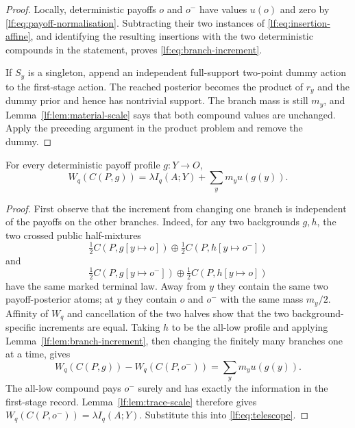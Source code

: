 \begin{proof}
Locally, deterministic payoffs $o$ and $o^-$ have values $u(o)$ and zero by
\eqref{lf:eq:payoff-normalisation}.  Subtracting their two instances of
\eqref{lf:eq:insertion-affine}, and identifying the resulting insertions with
the two deterministic compounds in the statement, proves
\eqref{lf:eq:branch-increment}.

If $S_y$ is a singleton, append an independent full-support two-point dummy
action to the first-stage action.  The reached posterior becomes the product of
$r_y$ and the dummy prior and hence has nontrivial support.  The branch mass is
still $m_y$, and Lemma~\ref{lf:lem:material-scale} says that both compound
values are unchanged.  Apply the preceding argument in the product problem and
remove the dummy.
\end{proof}

\begin{lemma}\label{lf:lem:deterministic-assembly}
For every deterministic payoff profile $g:Y\to O$,
\begin{equation}
W_q(C(P,g))
=\lambda I_q(A;Y)+\sum_y m_y u(g(y)).
\label{lf:eq:deterministic-assembly}
\end{equation}
\end{lemma}

\begin{proof}
First observe that the increment from changing one branch is independent of
the payoffs on the other branches.  Indeed, for any two backgrounds $g,h$, the
two crossed public half-mixtures
\[
\tfrac12 C(P,g[y\mapsto o])
\oplus\tfrac12 C(P,h[y\mapsto o^-])
\]
and
\[
\tfrac12 C(P,g[y\mapsto o^-])
\oplus\tfrac12 C(P,h[y\mapsto o])
\]
have the same marked terminal law.  Away from $y$ they contain the same two
payoff-posterior atoms; at $y$ they contain $o$ and $o^-$ with the same mass
$m_y/2$.  Affinity of $W_q$ and cancellation of the two halves show that the
two background-specific increments are equal.  Taking
$h$ to be the all-low profile and applying
Lemma~\ref{lf:lem:branch-increment}, then changing the finitely many branches
one at a time, gives
\begin{equation}
W_q(C(P,g))-W_q(C(P,o^-))
=\sum_y m_y u(g(y)).
\label{lf:eq:telescope}
\end{equation}
The all-low compound pays $o^-$ surely and has exactly the information in the
first-stage record.  Lemma~\ref{lf:lem:trace-scale} therefore gives
$W_q(C(P,o^-))=\lambda I_q(A;Y)$.  Substitute this into
\eqref{lf:eq:telescope}.
\end{proof}

